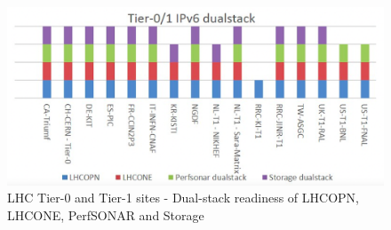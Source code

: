 
\begin{figure}[h!]
\centering
\includegraphics[width=13cm]{LHCOPN+ONE_status_300.png}
\caption{LHC Tier-0 and Tier-1 sites - Dual-stack readiness of LHCOPN, LHCONE, PerfSONAR and Storage}
\label{fig:LHC[OPN/ONE] Status of Tier-0 and Tier-1 readiness}
\end{figure}


